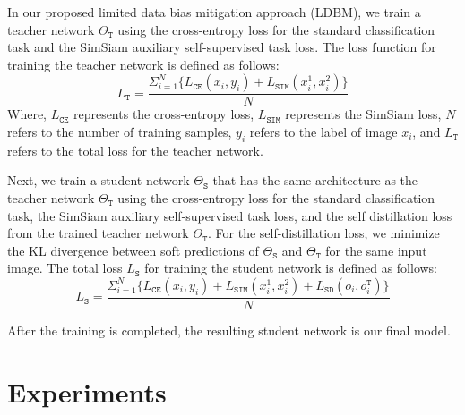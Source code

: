 \documentclass[10pt,twocolumn,letterpaper]{article}
\begin{document}
In our proposed limited data bias mitigation approach (LDBM), we train a teacher network $\Theta_{\texttt{T}}$ using the cross-entropy loss for the standard classification task and the SimSiam auxiliary self-supervised task loss. The loss function for training the teacher network is defined as follows:
\begin{equation}
    L_{\texttt{T}} = \frac{\Sigma_{i=1}^{N} \{L_{\texttt{CE}}(x_i,y_i) + L_{\texttt{SIM}}(x_i^1,x_i^2)\}}{N}
\end{equation}
Where, $L_{\texttt{CE}}$ represents the cross-entropy loss, $L_{\texttt{SIM}}$ represents the SimSiam loss, $N$ refers to the number of training samples, $y_i$ refers to the label of image $x_i$, and $L_{\texttt{T}}$ refers to the total loss for the teacher network.

Next, we train a student network $\Theta_{\texttt{S}}$ that has the same architecture as the teacher network $\Theta_{\texttt{T}}$ using the cross-entropy loss for the standard classification task, the SimSiam auxiliary self-supervised task loss, and the self distillation loss from the trained teacher network $\Theta_{\texttt{T}}$. For the self-distillation loss, we minimize the KL divergence between soft predictions of $\Theta_{\texttt{S}}$ and $\Theta_{\texttt{T}}$ for the same input image. The total loss $L_{\texttt{S}}$ for training the student network is defined as follows:
\begin{equation}
    L_{\texttt{S}} = \frac{\Sigma_{i=1}^{N}\{L_{\texttt{CE}}(x_i,y_i) + L_{\texttt{SIM}}(x_i^1,x_i^2) + L_{\texttt{SD}}(o_i,o_i^{\texttt{T}})\}}{N}
\end{equation}

After the training is completed, the resulting student network is our final model.


\section{Experiments}
\end{document}
